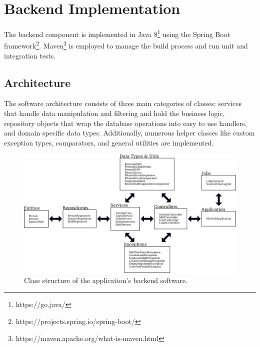 
\newpage

\section{Backend Implementation}
\label{impl:be}
The backend component is implemented in Java 8\footnote{https://go.java/} using the Spring Boot framework\footnote{https://projects.spring.io/spring-boot/}. Maven\footnote{https://maven.apache.org/what-is-maven.html} is employed to manage the build process and run unit and integration tests.

\subsection{Architecture}
The software architecture consists of three main categories of classes: services that handle data manipulation and filtering and hold the business logic, repository objects that wrap the database operations into easy to use handlers, and domain specific data types. Additionally, numerous helper classes like custom exception types, comparators, and general utilities are implemented.
\begin{figure}[!h]
    \centering
    \includegraphics[width=\textwidth]{images/be_structure.png}
    \caption[Diagram: Backend Classes]{Class structure of the application's backend software.}
    \label{fig:markovchain}
\end{figure}

